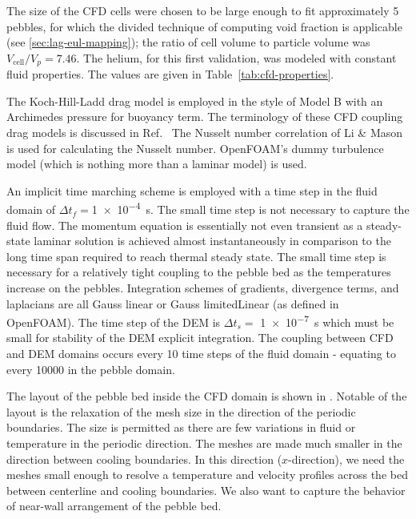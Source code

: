 
The size of the CFD cells were chosen to be large enough to fit approximately 5 pebbles, for which the divided technique of computing void fraction is applicable (see \cref{sec:lag-eul-mapping}); the ratio of cell volume to particle volume was $V_\text{cell} / V_p = 7.46$. The helium, for this first validation, was modeled with constant fluid properties. The values are given in Table~\ref{tab:cfd-properties}.

The Koch-Hill-Ladd drag model is employed in the style of Model B with an Archimedes pressure for buoyancy term. The terminology of these CFD coupling drag models is discussed in Ref.~\cite{Zhou2010} The Nusselt number correlation of Li \& Mason is used for calculating the Nusselt number. OpenFOAM's dummy turbulence model (which is nothing more than a laminar model) is used.

An implicit time marching scheme is employed with a time step in the fluid domain of $\Delta t_f =$\SI{1e-4}{\second}. The small time step is not necessary to capture the fluid flow. The momentum equation is essentially not even transient as a steady-state laminar solution is achieved almost instantaneously in comparison to the long time span required to reach thermal steady state. The small time step is necessary for a relatively tight coupling to the pebble bed as the temperatures increase on the pebbles. Integration schemes of gradients, divergence terms, and laplacians are all Gauss linear or Gauss limitedLinear (as defined in OpenFOAM). The time step of the DEM is $\Delta t_s =$ \SI{1e-7}{\second} which must be small for stability of the DEM explicit integration. The coupling between CFD and DEM domains occurs every 10 time steps of the fluid domain - equating to every \num{10000} in the pebble domain.

The layout of the pebble bed inside the CFD domain is shown in . Notable of the layout is the relaxation of the mesh size in the direction of the periodic boundaries. The size is permitted as there are few variations in fluid or temperature in the periodic direction. The meshes are made much smaller in the direction between cooling boundaries. In this direction ($x$-direction), we need the meshes small enough to resolve a temperature and velocity profiles across the bed between centerline and cooling boundaries. We also want to capture the behavior of near-wall arrangement of the pebble bed. 

